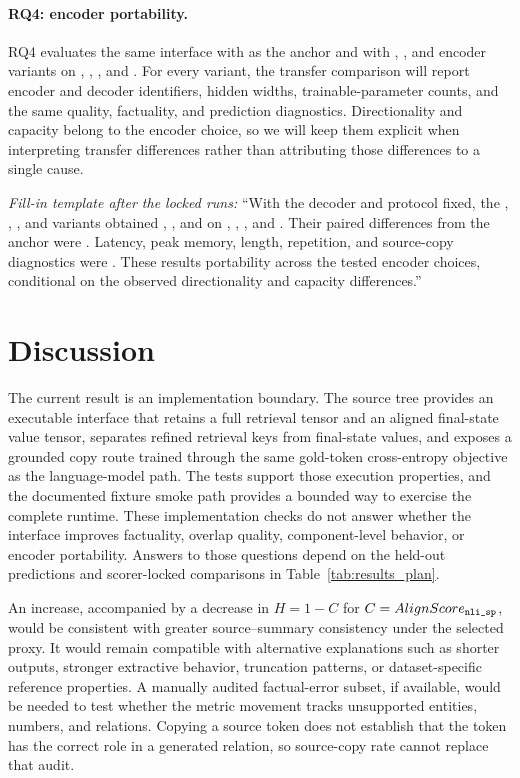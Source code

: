 \paragraph{RQ4: encoder portability.}
RQ4 evaluates the same interface with \PPLXEmbed as the anchor and with
\QwenCausal, \QwenEmbed, and \NemotronEmbed encoder variants on \PubMed,
\ArXiv, \BookSum, and \GovReport.  For every variant, the transfer comparison
will report encoder and decoder identifiers, hidden widths, trainable-parameter
counts, and the same quality, factuality, and prediction diagnostics.
Directionality and capacity belong to the encoder choice, so we will keep them
explicit when interpreting transfer differences rather than attributing those
differences to a single cause.

\emph{Fill-in template after the locked runs:} ``With the decoder and
protocol fixed, the \PPLXEmbed, \QwenCausal, \QwenEmbed, and \NemotronEmbed
variants obtained , , and
 on \PubMed, \ArXiv, \BookSum, and \GovReport.  Their
paired differences from the \PPLXEmbed anchor were .  Latency, peak memory, length, repetition, and source-copy
diagnostics were .  These results  portability across the tested encoder choices, conditional on the
observed directionality and capacity differences.''

\section{Discussion}
\label{sec:discussion}

The current result is an implementation boundary.  The source tree provides
an executable \AFMR interface that retains a full retrieval tensor and an
aligned final-state value tensor, separates
refined retrieval keys from final-state values, and exposes a grounded copy
route trained through the same gold-token cross-entropy objective as the
language-model path.  The tests support those execution properties, and the
documented fixture smoke path provides a bounded way to exercise the complete
runtime.  These implementation checks do not answer whether the interface
improves factuality, overlap quality, component-level behavior, or encoder
portability.  Answers to those questions depend on the held-out predictions
and scorer-locked comparisons in Table~\ref{tab:results_plan}.

An \AlignScore increase, accompanied by a decrease in $H=1-C$ for
$C=AlignScore_{\texttt{nli\_sp}}$,
would be consistent with greater source--summary consistency under the
selected proxy.  It would remain compatible with alternative explanations
such as shorter outputs, stronger extractive behavior, truncation patterns,
or dataset-specific reference properties.  A manually audited factual-error
subset, if available, would be needed to test whether the metric movement
tracks unsupported entities, numbers, and relations.  Copying a source token
does not establish that the token has the correct role in a generated
relation, so source-copy rate cannot replace that audit.

